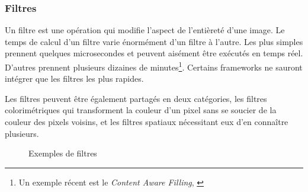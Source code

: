 			\subsubsection{Filtres}
				Un filtre est une opération qui modifie l'aspect de l'entièreté d'une image. Le temps de calcul d'un filtre varie
				énormément d'un filtre à l'autre. Les plus simples prennent quelques microsecondes et peuvent aisément être exécutés
				en temps réel. D'autres prennent plusieurs dizaines de minutes\footnote{Un exemple récent est le \emph{Content Aware Filling}, \cite{contentaware}}. Certains frameworks ne sauront intégrer que les filtres
				les plus rapides. 

				Les filtres peuvent être également partagés en deux catégories, les filtres colorimétriques qui transforment
				la couleur d'un pixel sans se soucier de la couleur des pixels voisins,  et les filtres spatiaux nécessitant 
				eux d'en connaître plusieurs. 
				\begin{figure}[h]
					\centering
					\caption{Exemples de filtres}
					\label{fig:filtres}
				\end{figure}
